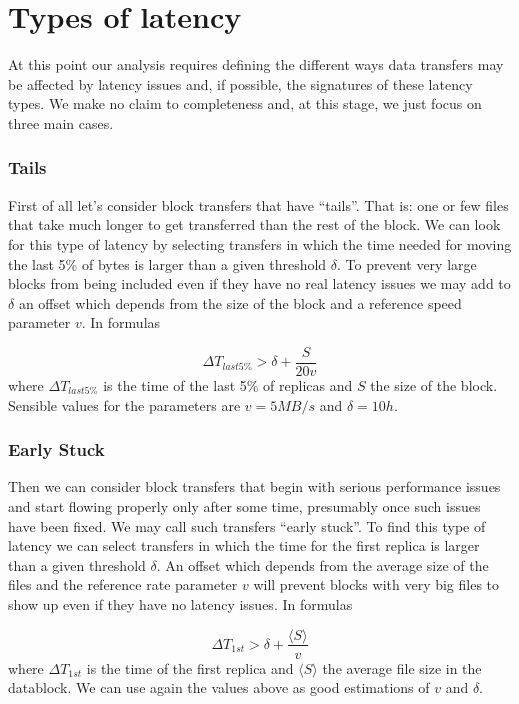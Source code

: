 \section{Types of latency}

At this point our analysis requires defining the different ways data
transfers may be affected by latency issues and, if possible, the
signatures of these latency types.  We make no claim to completeness
and, at this stage, we just focus on three main cases.

\subsubsection*{Tails}
First of all let's consider block transfers that have ``tails''. That
is: one or few files that take much longer to get transferred than the
rest of the block. We can look for this type of latency by selecting
transfers in which the time needed for moving the last 5\% of bytes is
larger than a given threshold $\delta$.  To prevent very large blocks
from being included even if they have no real latency issues we may
add to $\delta$ an offset which depends from the size of the block and
a reference speed parameter $v$.  In formulas

\begin{equation}
{\Delta}T_{last 5\%} > \delta + \frac{S}{20 v}
\label{eq:early-stuck}
\end{equation}
where ${\Delta}T_{last 5\%}$ is the time of the last 5\% of replicas and
$S$ the size of the block. Sensible values for the parameters are
$v=5MB/s$ and $\delta=10h$.

\subsubsection*{Early Stuck}
Then we can consider block transfers that begin with serious
performance issues and start flowing properly only after some time,
presumably once such issues have been fixed. We may call such
transfers ``early stuck''.  To find this type of latency we can select
transfers in which the time for the first replica is larger than a
given threshold $\delta$.  An offset which depends from the average
size of the files and the reference rate parameter $v$ will prevent
blocks with very big files to show up even if they have no latency
issues. In formulas

\begin{equation}
{\Delta}T_{1st} > \delta + \frac{\langle S \rangle}{v}
\label{eq:early-stuck}
\end{equation}
where ${\Delta}T_{1st}$ is the time of the first replica and $\langle
S \rangle$ the average file size in the datablock. We can use again
the values above as good estimations of $v$ and $\delta$.

